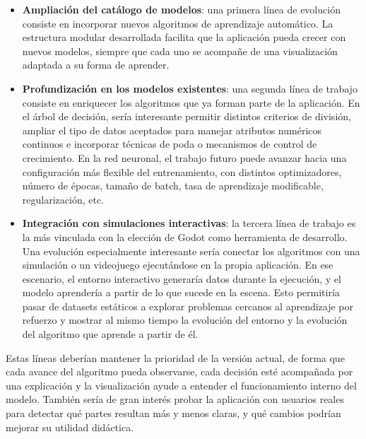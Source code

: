 \begin{itemize}
    \item \textbf{Ampliación del catálogo de modelos}: una primera línea de evolución consiste en incorporar nuevos algoritmos de aprendizaje automático. La estructura modular desarrollada facilita que la aplicación pueda crecer con nuevos modelos, siempre que cada uno se acompañe de una visualización adaptada a su forma de aprender. %
    \item \textbf{Profundización en los modelos existentes}: una segunda línea de trabajo consiste en enriquecer los algoritmos que ya forman parte de la aplicación. En el árbol de decisión, sería interesante permitir distintos criterios de división, ampliar el tipo de datos aceptados para manejar atributos numéricos continuos e incorporar técnicas de poda o mecanismos de control de crecimiento. En la red neuronal, el trabajo futuro puede avanzar hacia una configuración más flexible del entrenamiento, con distintos optimizadores, número de épocas, tamaño de batch, tasa de aprendizaje modificable, regularización, etc. %
    \item \textbf{Integración con simulaciones interactivas}: la tercera línea de trabajo es la más vinculada con la elección de Godot como herramienta de desarrollo. Una evolución especialmente interesante sería conectar los algoritmos con una simulación o un videojuego ejecutándose en la propia aplicación. En ese escenario, el entorno interactivo generaría datos durante la ejecución, y el modelo aprendería a partir de lo que sucede en la escena. Esto permitiría pasar de datasets estáticos a explorar problemas cercanos al aprendizaje por refuerzo y mostrar al mismo tiempo la evolución del entorno y la evolución del algoritmo que aprende a partir de él.
\end{itemize}

Estas líneas deberían mantener la prioridad de la versión actual, de forma que cada avance del algoritmo pueda observarse, cada decisión esté acompañada por una explicación y la visualización ayude a entender el funcionamiento interno del modelo. También sería de gran interés probar la aplicación con usuarios reales para detectar qué partes resultan más y menos claras, y qué cambios podrían mejorar su utilidad didáctica.
